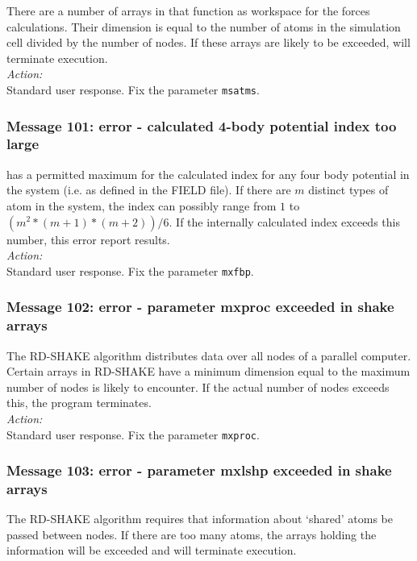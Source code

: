 There are a number of arrays in \D{} that function as workspace
for the forces calculations. Their dimension is equal to the number of
atoms in the simulation cell divided by the number of nodes. If these
arrays are likely to be exceeded, \D{} will terminate execution. \\ 

\noindent
{\em Action:} \\ 
Standard user response. Fix the parameter {\tt msatms}.

\subsubsection*{Message 101: error - calculated
4-body  potential index too large}

\D{} has a permitted maximum for the calculated index for any
four body potential in the system (i.e. as defined in the FIELD
file). If there are $m$ distinct types of atom in the system, the
index can possibly range from $1$ to $(m^{2}*(m+1)*(m+2))/6$. If the
internally calculated index exceeds this number, this error report
results. \\

\noindent
{\em Action:} \\
Standard user response. Fix the parameter {\tt mxfbp}.

\subsubsection*{Message 102: error - parameter mxproc exceeded in shake arrays}

The RD-SHAKE algorithm  distributes data over all nodes of a parallel
computer. Certain arrays in RD-SHAKE have a minimum dimension equal to
the maximum number of nodes \D{} is likely to encounter. If the
actual number of nodes exceeds this, the program terminates. \\ 

\noindent
{\em Action:} \\ 
Standard user response. Fix the parameter {\tt mxproc}.

\subsubsection*{Message 103: error - parameter mxlshp exceeded in shake arrays}

The RD-SHAKE algorithm requires that information about `shared' atoms
be passed between nodes. If there are too many atoms, the arrays
holding the information will be exceeded and \D{} will terminate
execution. \\ 

